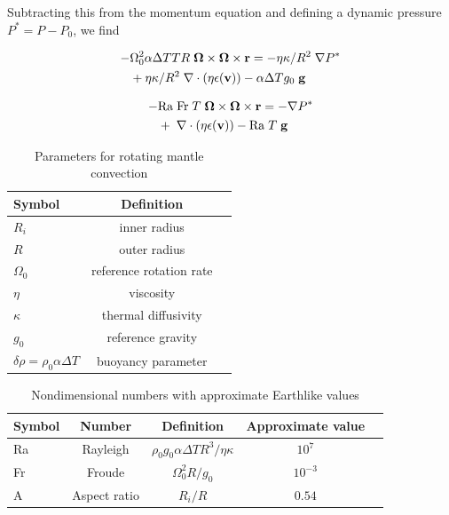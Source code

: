 \documentclass[extra,mreferee]{gji}
\begin{document}
Subtracting this from the momentum equation and defining a dynamic pressure $P^* = P - P_0$, we find

\begin{equation}
\begin{aligned}
 - & \Omega_0^2  \alpha  \Delta T T R \; {\bf \Omega \times \Omega \times r} = - \eta \kappa / R^2 \; \nabla P^* \\ 
&+ \eta \kappa / R^2 \; \nabla \cdot \left( \eta \epsilon ({\bf v}) \right) - \alpha \Delta T g_0 \; {\bf g}
\end{aligned}
\end{equation}

\begin{equation}
\begin{aligned}
 - & \mathrm{Ra \; Fr}\; T \; {\bf \Omega \times \Omega \times r} = - \nabla P^* \\ 
&+ \; \nabla \cdot \left( \eta \epsilon ({\bf v}) \right) - \mathrm{Ra} \; T \; {\bf g}
\end{aligned}
\end{equation}

  
\fi

\begin{table}
\centering
\caption{Parameters for rotating mantle convection}
\label{parameters}
\begin{tabular}{@{}lcc}
Symbol & Definition\\
\hline
$R_i$ & inner radius \\
$R$ & outer radius \\
$\Omega_0$ & reference rotation rate \\
$\eta$ & viscosity \\
$\kappa$ & thermal diffusivity \\
$g_0$ & reference gravity \\
$\delta \rho = \rho_0 \alpha \Delta T$ & buoyancy parameter \\ 
\end{tabular}
\end{table}

\begin{table}
\centering
\caption{Nondimensional numbers with approximate Earthlike values}
\label{nondim}
\begin{tabular}{@{}lcccc}
Symbol &  Number & Definition & Approximate value \\
\hline
Ra & Rayleigh &  $\rho_0 g_0 \alpha \Delta T R^3/\eta \kappa$ & $10^7$\\
Fr & Froude & $\Omega_0^2 R/g_0$ & $10^{-3}$ \\
A & Aspect ratio & $R_i/R$ & $0.54$ \\
\end{tabular}
\end{table}
 
\end{document}
